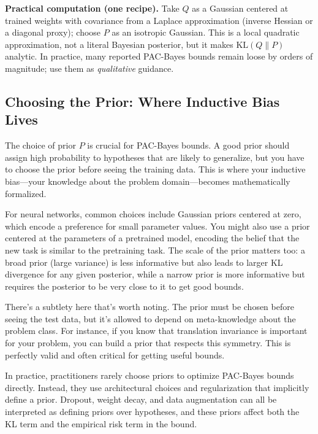 \vspace{1em}


\vspace{0.3cm}
\textbf{Practical computation (one recipe).} Take $Q$ as a Gaussian centered at trained weights with covariance from a Laplace approximation (inverse Hessian or a diagonal proxy); choose $P$ as an isotropic Gaussian. This is a local quadratic approximation, not a literal Bayesian posterior, but it makes $\mathrm{KL}(Q\|P)$ analytic. In practice, many reported PAC\mbox{-}Bayes bounds remain loose by orders of magnitude; use them as \emph{qualitative} guidance.
\subsection{Choosing the Prior: Where Inductive Bias Lives}

The choice of prior $P$ is crucial for PAC-Bayes bounds. A good prior should assign high probability to hypotheses that are likely to generalize, but you have to choose the prior before seeing the training data. This is where your inductive bias---your knowledge about the problem domain---becomes mathematically formalized.

\vspace{0.3cm}

For neural networks, common choices include Gaussian priors centered at zero, which encode a preference for small parameter values. You might also use a prior centered at the parameters of a pretrained model, encoding the belief that the new task is similar to the pretraining task. The scale of the prior matters too: a broad prior (large variance) is less informative but also leads to larger KL divergence for any given posterior, while a narrow prior is more informative but requires the posterior to be very close to it to get good bounds.

\vspace{0.3cm}

There's a subtlety here that's worth noting. The prior must be chosen before seeing the test data, but it's allowed to depend on meta-knowledge about the problem class. For instance, if you know that translation invariance is important for your problem, you can build a prior that respects this symmetry. This is perfectly valid and often critical for getting useful bounds.

\vspace{0.3cm}

In practice, practitioners rarely choose priors to optimize PAC-Bayes bounds directly. Instead, they use architectural choices and regularization that implicitly define a prior. Dropout, weight decay, and data augmentation can all be interpreted as defining priors over hypotheses, and these priors affect both the KL term and the empirical risk term in the bound.

